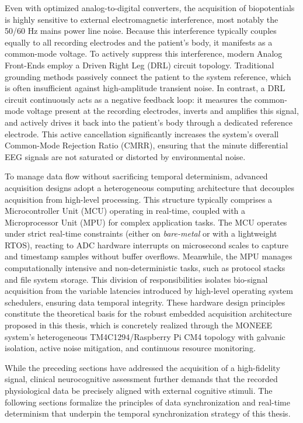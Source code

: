 Even with optimized analog-to-digital converters, the acquisition of biopotentials is highly sensitive to external electromagnetic interference, most notably the 50/60 Hz mains power line noise. Because this interference typically couples equally to all recording electrodes and the patient's body, it manifests as a common-mode voltage. To actively suppress this interference, modern Analog Front-Ends employ a Driven Right Leg (DRL) circuit topology. Traditional grounding methods passively connect the patient to the system reference, which is often insufficient against high-amplitude transient noise. In contrast, a DRL circuit continuously acts as a negative feedback loop: it measures the common-mode voltage present at the recording electrodes, inverts and amplifies this signal, and actively drives it back into the patient's body through a dedicated reference electrode. This active cancellation significantly increases the system's overall Common-Mode Rejection Ratio (CMRR), ensuring that the minute differential EEG signals are not saturated or distorted by environmental noise.

To manage data flow without sacrificing temporal determinism, advanced acquisition designs adopt a heterogeneous computing architecture that decouples acquisition from high-level processing. This structure typically comprises a Microcontroller Unit (MCU) operating in real-time, coupled with a Microprocessor Unit (MPU) for complex application tasks. The MCU operates under strict real-time constraints (either on \textit{bare-metal} or with a lightweight RTOS), reacting to ADC hardware interrupts on microsecond scales to capture and timestamp samples without buffer overflows. Meanwhile, the MPU manages computationally intensive and non-deterministic tasks, such as protocol stacks and file system storage. This division of responsibilities isolates bio-signal acquisition from the variable latencies introduced by high-level operating system schedulers, ensuring data temporal integrity. These hardware design principles constitute the theoretical basis for the robust embedded acquisition architecture proposed in this thesis, which is concretely realized through the MONEEE system's heterogeneous TM4C1294/Raspberry Pi CM4 topology with galvanic isolation, active noise mitigation, and continuous resource monitoring.

While the preceding sections have addressed the acquisition of a high-fidelity signal, clinical neurocognitive assessment further demands that the recorded physiological data be precisely aligned with external cognitive stimuli. The following sections formalize the principles of data synchronization and real-time determinism that underpin the temporal synchronization strategy of this thesis.

